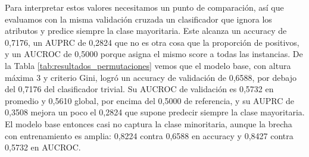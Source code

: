 \documentclass[10pt,a4paper]{article}
\begin{document}
\begin{table}[H]
\centering
{}
\caption{Métricas de un árbol de altura máxima 3 con criterio Gini, por fold de la validación cruzada estratificada de 5 particiones sobre el conjunto de desarrollo. Global se calcula sobre las predicciones acumuladas de los 5 folds de validación}
\label{tab:resultados_permutaciones}
\end{table}

Para interpretar estos valores necesitamos un punto de comparación, así que evaluamos con la misma validación cruzada un clasificador que ignora los atributos y predice siempre la clase mayoritaria. Este alcanza un accuracy de 0,7176, un AUPRC de 0,2824 que no es otra cosa que la proporción de positivos, y un AUCROC de 0,5000 porque asigna el mismo score a todas las instancias.
De la Tabla \ref{tab:resultados_permutaciones} vemos que el modelo base, con altura máxima 3 y criterio Gini, logró un accuracy de validación de 0,6588, por debajo del 0,7176 del clasificador trivial. Su AUCROC de validación es 0,5732 en promedio y 0,5610 global, por encima del 0,5000 de referencia, y su AUPRC de 0,3508 mejora un poco el 0,2824 que supone predecir siempre la clase mayoritaria. El modelo base entonces casi no captura la clase minoritaria, aunque la brecha con entrenamiento es amplia: 0,8224 contra 0,6588 en accuracy y 0,8427 contra 0,5732 en AUCROC.
\end{document}
